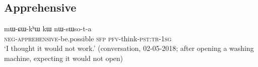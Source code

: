  \subsection{Apprehensive} \label{sec:apprehensive}
  
\begin{exe}
\ex 
\gll   mɯ-ɕɯ-kʰɯ kɯ nɯ-sɯso-t-a \\
\textsc{neg}-\textsc{apprehensive}-be.possible \textsc{sfp} \textsc{pfv}-think-\textsc{pst}:\textsc{tr}-\textsc{1sg} \\
\glt `I thought it would not work.'  (conversation, 02-05-2018; after opening a washing machine, expecting it would not open)
\end{exe}
